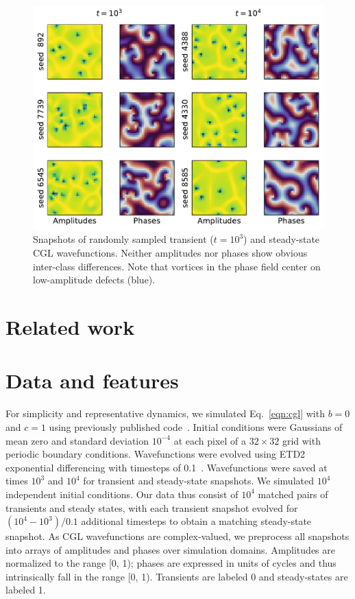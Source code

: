 \documentclass[nofootinbib,pre,superscriptaddress,twocolumn,longbibliography,floatfix]{revtex4-2}
\begin{document}
\begin{figure}[h]
    \centering
    \includegraphics[width=1.0\linewidth]{../figures/samples_indistinguishable.pdf}
    \caption{Snapshots of randomly sampled transient ($t=10^3$) and steady-state CGL wavefunctions.
    Neither amplitudes nor phases show obvious inter-class differences.
    Note that vortices in the phase field center on low-amplitude defects (blue).}
    \label{fig:samples_indistinguishable}
\end{figure}

\section{Related work}


\section{Data and features}
For simplicity and representative dynamics, we simulated Eq.~\ref{eqn:cgl} with $b=0$ and $c=1$ using previously published code~\cite{winterbottom2005complex,li2024measuring}.
Initial conditions were Gaussians of mean zero and standard deviation $10^{-4}$ at each pixel of a $32\times 32$ grid with periodic boundary conditions.
Wavefunctions were evolved using ETD2 exponential differencing with timesteps of 0.1~\cite{cox2002exponential}.
Wavefunctions were saved at times $10^3$ and $10^4$ for transient and steady-state snapshots.
We simulated $10^4$ independent initial conditions.
Our data thus consist of $10^4$ matched pairs of transients and steady states,
with each transient snapshot evolved for $(10^4-10^3)/0.1$ additional timesteps to obtain a matching steady-state snapshot.
As CGL wavefunctions are complex-valued,
we preprocess all snapshots into arrays of amplitudes and phases over simulation domains.
Amplitudes are normalized to the range [0, 1);
phases are expressed in units of cycles and thus intrinsically fall in the range [0, 1).
Transients are labeled 0 and steady-states are labeled 1.
\end{document}
